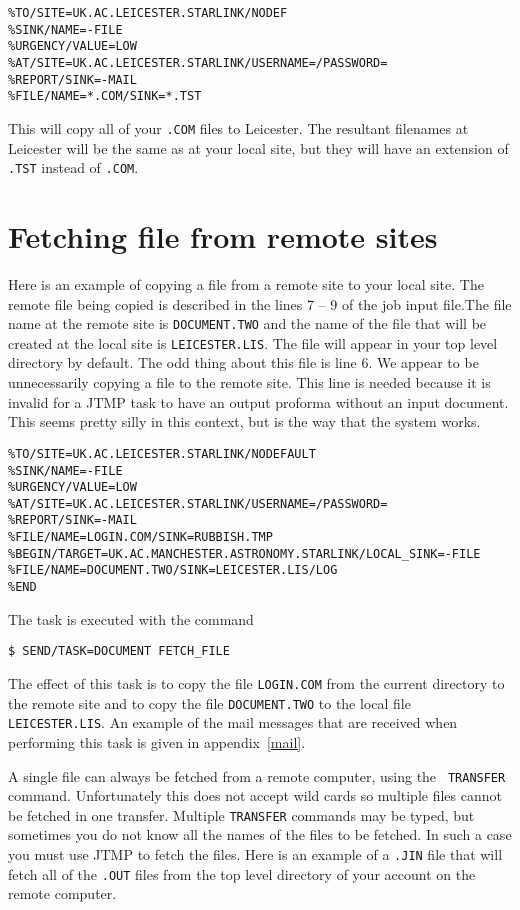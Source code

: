 \begin{verbatim}
%TO/SITE=UK.AC.LEICESTER.STARLINK/NODEF
%SINK/NAME=-FILE
%URGENCY/VALUE=LOW
%AT/SITE=UK.AC.LEICESTER.STARLINK/USERNAME=/PASSWORD=
%REPORT/SINK=-MAIL
%FILE/NAME=*.COM/SINK=*.TST
\end{verbatim}

This will copy all of your {\tt .COM} files to Leicester. The resultant
filenames at Leicester will be the same as at your local site, but they will
have an extension of {\tt .TST} instead of {\tt .COM}.

\section{Fetching file from remote sites}

Here is an example of copying a file from a remote site to your local site. The
remote file being copied is described in the lines 7 -- 9 of the job input
file.The file name at the remote site is {\tt DOCUMENT.TWO} and the name of the
file that will be created at the local site is {\tt LEICESTER.LIS}. The file
will appear in your top level directory by default. The odd thing about this
file is line 6. We appear to be unnecessarily copying a file to the remote
site. This line is needed because it is invalid for a JTMP task to have an
output proforma without an input document. This seems pretty silly in this
context, but is the way that the system works.

\begin{verbatim}
%TO/SITE=UK.AC.LEICESTER.STARLINK/NODEFAULT
%SINK/NAME=-FILE
%URGENCY/VALUE=LOW
%AT/SITE=UK.AC.LEICESTER.STARLINK/USERNAME=/PASSWORD=
%REPORT/SINK=-MAIL
%FILE/NAME=LOGIN.COM/SINK=RUBBISH.TMP
%BEGIN/TARGET=UK.AC.MANCHESTER.ASTRONOMY.STARLINK/LOCAL_SINK=-FILE
%FILE/NAME=DOCUMENT.TWO/SINK=LEICESTER.LIS/LOG
%END
\end{verbatim}

The task is executed with the command

\begin{verbatim}
$ SEND/TASK=DOCUMENT FETCH_FILE
\end{verbatim}

The effect of this task is to copy the file {\tt LOGIN.COM} from the current
directory to the remote site and to copy the file {\tt DOCUMENT.TWO} to the
local file {\tt LEICESTER.LIS}. An example of the mail messages that are
received when performing this task is given in appendix~\ref{mail}.

A single file can always be fetched from a remote computer, using the  {\tt
TRANSFER} command. Unfortunately this does not accept wild cards so multiple
files cannot be fetched in one transfer. Multiple {\tt TRANSFER} commands may
be typed, but sometimes you do not know all the names of the files to be
fetched. In such a case you must use JTMP to fetch the files. Here is an
example of a {\tt .JIN} file that will fetch all of the {\tt .OUT} files from
the top level directory of your account on the remote computer.


